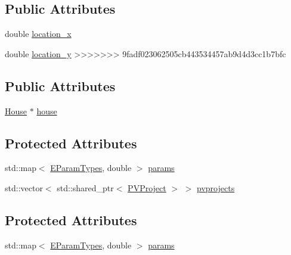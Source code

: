 \subsection*{Public Attributes}
{\bf }\par
\begin{DoxyCompactItemize}
\item 
double \hyperlink{classsolar__core_1_1_household_a6596375631a366fdd24270f75548841f}{location\+\_\+x}
\item 
double \hyperlink{classsolar__core_1_1_household_a1ba6b7af82982096e05d99a70a2647eb}{location\+\_\+y}
>>>>>>> 9fadf023062505cb443534457ab9d4d3cc1b7bfc
\end{DoxyCompactItemize}

\subsection*{Public Attributes}
{\bf }\par
\begin{DoxyCompactItemize}
\item 
\hyperlink{classsolar__core_1_1_house}{House} $\ast$ \hyperlink{classsolar__core_1_1_household_a1104d8264fe733937e1fd2e9ad0f8fc1}{house}
\end{DoxyCompactItemize}

\subsection*{Protected Attributes}
{\bf }\par
\begin{DoxyCompactItemize}
\item 
std\+::map$<$ \hyperlink{namespacesolar__core_aa1147341e5ef7a40d68d1bd68e149362}{E\+Param\+Types}, double $>$ \hyperlink{classsolar__core_1_1_household_a41d61dc3bab971cb19170341b77d9df8}{params}
\end{DoxyCompactItemize}

{\bf }\par
\begin{DoxyCompactItemize}
\item 
std\+::vector$<$ std\+::shared\+\_\+ptr$<$ \hyperlink{classsolar__core_1_1_p_v_project}{P\+V\+Project} $>$ $>$ \hyperlink{classsolar__core_1_1_household_a79c0e955af98669487e0fb472811f842}{pvprojects}
\end{DoxyCompactItemize}

\subsection*{Protected Attributes}
{\bf }\par
\begin{DoxyCompactItemize}
\item 
std\+::map$<$ \hyperlink{namespacesolar__core_aa1147341e5ef7a40d68d1bd68e149362}{E\+Param\+Types}, double $>$ \hyperlink{classsolar__core_1_1_household_a41d61dc3bab971cb19170341b77d9df8}{params}
\end{DoxyCompactItemize}

